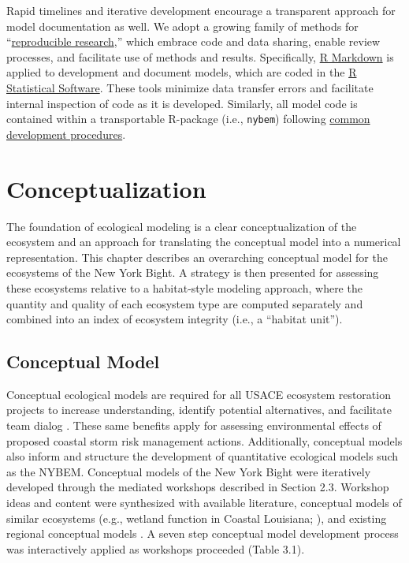 \documentclass[
]{book}
\begin{document}
Rapid timelines and iterative development encourage a transparent approach for model documentation as well. We adopt a growing family of methods for ``\href{https://ropensci.github.io/reproducibility-guide/sections/introduction/}{reproducible research},'' which embrace code and data sharing, enable review processes, and facilitate use of methods and results. Specifically, \href{https://rmarkdown.rstudio.com/}{R Markdown} is applied to development and document models, which are coded in the \href{https://cran.r-project.org/}{R Statistical Software}. These tools minimize data transfer errors and facilitate internal inspection of code as it is developed. Similarly, all model code is contained within a transportable R-package (i.e., \texttt{nybem}) following \href{https://r-pkgs.org/}{common development procedures}.

\hypertarget{conceptualization}{%
\chapter{Conceptualization}\label{conceptualization}}

The foundation of ecological modeling is a clear conceptualization of the ecosystem and an approach for translating the conceptual model into a numerical representation. This chapter describes an overarching conceptual model for the ecosystems of the New York Bight. A strategy is then presented for assessing these ecosystems relative to a habitat-style modeling approach, where the quantity and quality of each ecosystem type are computed separately and combined into an index of ecosystem integrity (i.e., a ``habitat unit'').

\hypertarget{conceptual-model}{%
\section{Conceptual Model}\label{conceptual-model}}

Conceptual ecological models are required for all USACE ecosystem restoration projects to increase understanding, identify potential alternatives, and facilitate team dialog \citep{fischenich_application_2008, us_army_corps_of_engineers_assuring_2011}. These same benefits apply for assessing environmental effects of proposed coastal storm risk management actions. Additionally, conceptual models also inform and structure the development of quantitative ecological models \citep{grant_ecological_2008, swannack_ecological_2012} such as the NYBEM. Conceptual models of the New York Bight were iteratively developed through the mediated workshops described in Section 2.3. Workshop ideas and content were synthesized with available literature, conceptual models of similar ecosystems (e.g., wetland function in Coastal Louisiana; \citet{twilley_formulation_nodate}), and existing regional conceptual models \citep[e.g.,][]{montagna_conceptual_2013}. A seven step conceptual model development process was interactively applied as workshops proceeded (Table 3.1).
\end{document}
